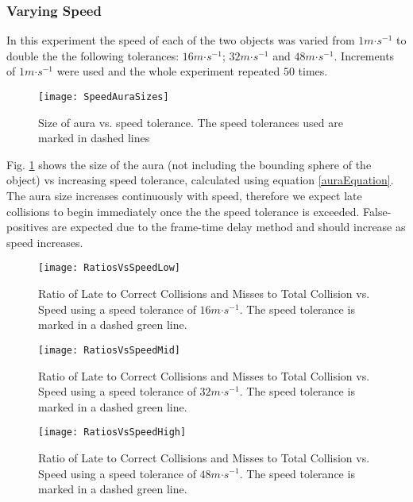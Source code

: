 \subsubsection{Varying Speed}

In this experiment the speed of each of the two objects was varied from $1m\mathord{\cdot}s^{-1}$ to double the the following tolerances: $16m\mathord{\cdot}s^{-1}$; $32m\mathord{\cdot}s^{-1}$ and $48m\mathord{\cdot}s^{-1}$. Increments of $1m\mathord{\cdot}s^{-1}$ were used and the whole experiment repeated $50$ times.

\begin{figure}
	\centering
	\texttt{[image: SpeedAuraSizes]}
	\caption{Size of aura vs. speed tolerance. The speed tolerances used are marked in dashed lines}
	\label{fig_SpeedAuraSize}
\end{figure}

Fig. \ref{fig_SpeedAuraSize} shows the size of the aura (not including the bounding sphere of the object) vs increasing speed tolerance, calculated using equation \ref{auraEquation}.
The aura size increases continuously with speed, therefore we expect late collisions to begin immediately once the the speed tolerance is exceeded. False-positives are expected due to the frame-time delay method and should increase as speed increases.

\begin{figure}
	\centering
	\texttt{[image: RatiosVsSpeedLow]}
	\caption{Ratio of Late to Correct Collisions and Misses to Total Collision vs. Speed using a speed tolerance of $16m\mathord{\cdot}s^{-1}$. The speed tolerance is marked in a dashed green line.}
	\label{fig_RatioVsSpeedLow}
\end{figure}
\begin{figure}
	\centering
	\texttt{[image: RatiosVsSpeedMid]}
	\caption{Ratio of Late to Correct Collisions and Misses to Total Collision vs. Speed using a speed tolerance of $32m\mathord{\cdot}s^{-1}$. The speed tolerance is marked in a dashed green line.}
	\label{fig_RatioVsSpeedMid}
\end{figure}
\begin{figure}
	\centering
	\texttt{[image: RatiosVsSpeedHigh]}
	\caption{Ratio of Late to Correct Collisions and Misses to Total Collision vs. Speed using a speed tolerance of $48m\mathord{\cdot}s^{-1}$. The speed tolerance is marked in a dashed green line.}
	\label{fig_RatioVsSpeedHigh}
\end{figure}

